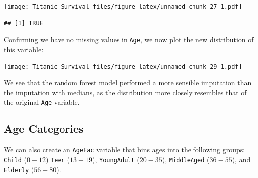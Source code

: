 \documentclass[]{article}
\newenvironment{Shaded}{\begin{snugshade}}{\end{snugshade}}
\newcommand{\KeywordTok}[1]{\textcolor[rgb]{0.13,0.29,0.53}{\textbf{#1}}}
\newcommand{\DataTypeTok}[1]{\textcolor[rgb]{0.13,0.29,0.53}{#1}}
\newcommand{\DecValTok}[1]{\textcolor[rgb]{0.00,0.00,0.81}{#1}}
\newcommand{\StringTok}[1]{\textcolor[rgb]{0.31,0.60,0.02}{#1}}
\newcommand{\CommentTok}[1]{\textcolor[rgb]{0.56,0.35,0.01}{\textit{#1}}}
\newcommand{\OperatorTok}[1]{\textcolor[rgb]{0.81,0.36,0.00}{\textbf{#1}}}
\newcommand{\NormalTok}[1]{#1}
\begin{document}
\texttt{[image: Titanic\_Survival\_files/figure-latex/unnamed-chunk-27-1.pdf]}

\begin{Shaded}
\end{Shaded}

\begin{verbatim}
## [1] TRUE
\end{verbatim}

Confirming we have no missing values in \texttt{Age}, we now plot the
new distribution of this variable:

\texttt{[image: Titanic\_Survival\_files/figure-latex/unnamed-chunk-29-1.pdf]}

We see that the random forest model performed a more sensible imputation
than the imputation with medians, as the distribution more closely
resembles that of the original \texttt{Age} variable.

\subsection{Age Categories}\label{age-categories}

We can also create an \texttt{AgeFac} variable that bins ages into the
following groups: \texttt{Child} (\(0-12\)) \texttt{Teen} (\(13-19\)),
\texttt{YoungAdult} (\(20-35\)), \texttt{MiddleAged} (\(36-55\)), and
\texttt{Elderly} (\(56-80\)).
\end{document}
